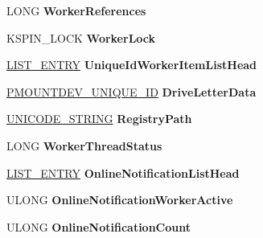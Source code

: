 \begin{DoxyCompactItemize}
L\+O\+NG {\bfseries Worker\+References}
\item 
\mbox{\label{struct___d_e_v_i_c_e___e_x_t_e_n_s_i_o_n_a55027fb843b71a4cd0787759f9c7b0ca}} 
K\+S\+P\+I\+N\+\_\+\+L\+O\+CK {\bfseries Worker\+Lock}
\item 
\mbox{\label{struct___d_e_v_i_c_e___e_x_t_e_n_s_i_o_n_ac661fcd40e42fffbe6e85a7c51a5d5cd}} 
\hyperlink{struct___l_i_s_t___e_n_t_r_y}{L\+I\+S\+T\+\_\+\+E\+N\+T\+RY} {\bfseries Unique\+Id\+Worker\+Item\+List\+Head}
\item 
\mbox{\label{struct___d_e_v_i_c_e___e_x_t_e_n_s_i_o_n_a53e2b53740dd9f1fca8fbfe74d01648e}} 
\hyperlink{struct___m_o_u_n_t_d_e_v___u_n_i_q_u_e___i_d}{P\+M\+O\+U\+N\+T\+D\+E\+V\+\_\+\+U\+N\+I\+Q\+U\+E\+\_\+\+ID} {\bfseries Drive\+Letter\+Data}
\item 
\mbox{\label{struct___d_e_v_i_c_e___e_x_t_e_n_s_i_o_n_a9d7d76025fc3fb6ac41f45febedb8a7c}} 
\hyperlink{struct___u_n_i_c_o_d_e___s_t_r_i_n_g}{U\+N\+I\+C\+O\+D\+E\+\_\+\+S\+T\+R\+I\+NG} {\bfseries Registry\+Path}
\item 
\mbox{\label{struct___d_e_v_i_c_e___e_x_t_e_n_s_i_o_n_a255059cab423ae768467a5d40b80d2aa}} 
L\+O\+NG {\bfseries Worker\+Thread\+Status}
\item 
\mbox{\label{struct___d_e_v_i_c_e___e_x_t_e_n_s_i_o_n_a954991121877d4f8d06cad287c6501ab}} 
\hyperlink{struct___l_i_s_t___e_n_t_r_y}{L\+I\+S\+T\+\_\+\+E\+N\+T\+RY} {\bfseries Online\+Notification\+List\+Head}
\item 
\mbox{\label{struct___d_e_v_i_c_e___e_x_t_e_n_s_i_o_n_a5befa168dec7f9bc424258c3d3cdf2e8}} 
U\+L\+O\+NG {\bfseries Online\+Notification\+Worker\+Active}
\item 
\mbox{\label{struct___d_e_v_i_c_e___e_x_t_e_n_s_i_o_n_a137a7b625611cfb722c0b702d476fe7f}} 
U\+L\+O\+NG {\bfseries Online\+Notification\+Count}
\item 

\end{DoxyCompactItemize}
